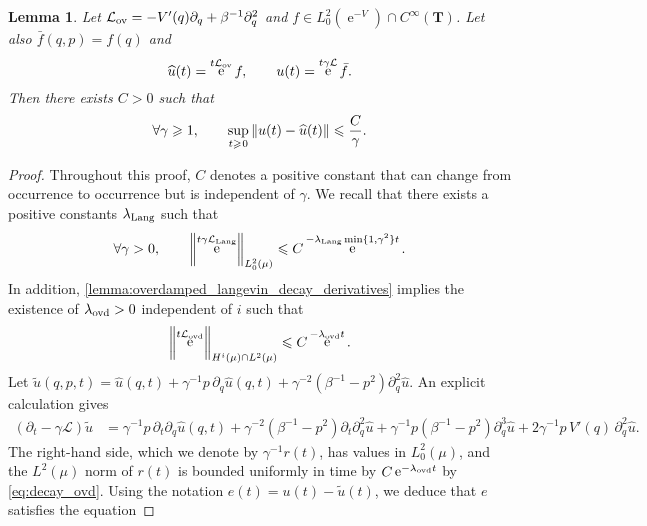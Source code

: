 \documentclass[11pt,a4paper]{article}
\DeclareMathOperator{\e}{e}
\newcommand{\torus}{\mathbf T}
\theoremstyle{plain}
\newtheorem{lemma}{Lemma}[section]
\numberwithin{equation}{section}
\renewcommand{\leq}{\leqslant}
\renewcommand{\geq}{\geqslant}
\begin{document}
\begin{lemma}
    \label{lemma:backward_kolmogorov_obs_q}
    Let $\mathcal L_{\rm ov} = - V'(q) \partial_q + \beta^{-1} \partial_q^2$ and $f \in L^2_0(\e^{-V}) \cap C^{\infty}(\torus)$.
    Let also $\bar f(q, p) = f(q)$ and
    \[
        \widehat u(t) = \e^{t\mathcal L_{\rm ov}} f, \qquad
        u(t) = \e^{t \gamma\mathcal L} \bar f.
    \]
    Then there exists $C > 0$ such that
    \[
        \forall \gamma \geq 1, \qquad
        \sup_{t \geq \!\!0}
        \norm{u(t)  - \widehat u(t)} \leq \frac{C}{\gamma}.
    \]
\end{lemma}
\begin{proof}
    Throughout this proof, $C$ denotes a positive constant that can change from occurrence to occurrence but is independent of $\gamma$.
    We recall that there exists a positive constants $\lambda_{\rm Lang}$ such that~\cite{roussel2018spectral,pavliotis2011applied}
    \begin{equation}
        \label{eq:decay_langevin}
        \forall \gamma > 0, \qquad
        \norm{\e^{t \gamma \mathcal L_{\rm Lang}}}[L^2_0(\mu)] \leq C \e^{- \lambda_{\rm Lang} \min\{1,\gamma^2\} t}.
    \end{equation}
    In addition, \cref{lemma:overdamped_langevin_decay_derivatives} implies the existence of $\lambda_{\rm ovd} > 0$ independent of $i$ such that
    \begin{equation}
        \label{eq:decay_ovd}
        \norm{\e^{t \mathcal L_{\rm ovd}}}[H^i(\mu) \cap L^2(\mu)] \leq C \e^{- \lambda_{\rm ovd} t}.
    \end{equation}
    Let $\widetilde u(q, p, t) = \widehat u(q, t) + \gamma^{-1} p \, \partial_q \widehat u(q, t) + \gamma^{-2} (\beta^{-1} - p^2) \partial_q^{2} \widehat u$.
    An explicit calculation gives
    \begin{align*}
        (\partial_t - \gamma \mathcal L) \widetilde u
        &= \gamma^{-1} p \, \partial_t \partial_q \widehat u(q, t) + \gamma^{-2} (\beta^{-1} - p^2) \partial_t \partial_q^{2} \widehat u
        + \gamma^{-1} p (\beta^{-1} - p^2) \partial_q^{3} \widehat u + 2 \gamma^{-1} p \, V'(q) \, \partial_q^2 \widehat u.
    \end{align*}
    The right-hand side, which we denote by $\gamma^{-1} r(t)$, has values in $L^2_0(\mu)$,
    and the $L^2(\mu)$ norm of $r(t)$ is bounded uniformly in time by $C \e^{-\lambda_{\rm ovd} t}$ by \eqref{eq:decay_ovd}.
    Using the notation $e(t) = u(t) - \widetilde u(t)$,
    we deduce that $e$ satisfies the equation

\end{proof}
\end{document}
